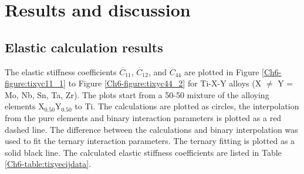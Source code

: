 \section{Results and discussion}

\subsection{Elastic calculation results}

The elastic stiffness coefficients $\overline{C}_{11}$, $\overline{C}_{12}$, and $\overline{C}_{44}$ are plotted in Figure \ref{Ch6-figure:tixyc11_1} to Figure \ref{Ch6-figure:tixyc44_2} for Ti-X-Y alloys (X $\neq$ Y = Mo, Nb, Sn, Ta, Zr). The plots start from a 50-50 mixture of the alloying elements X$_{0.50}$Y$_{0.50}$ to Ti. The calculations are plotted as circles, the interpolation from the pure elements and binary interaction parameters is plotted as a red dashed line. The difference between the calculations and binary interpolation was used to fit the ternary interaction parameters. The ternary fitting is plotted as a solid black line. The calculated elastic stiffness coefficients are listed in Table \ref{Ch6-table:tixyecijdata}.

